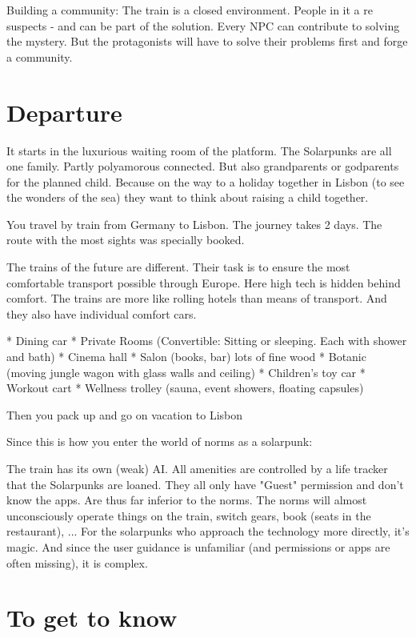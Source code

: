 \documentclass{book}
\begin{document}
Building a community:
The train is a closed environment. People in it a re suspects - and can be part of the solution. Every NPC can contribute to solving the mystery. But the protagonists will have to solve their problems first and forge a community.

\section{Departure}

It starts in the luxurious waiting room of the platform. The Solarpunks are all one family. Partly polyamorous connected. But also grandparents or godparents for the planned child. Because on the way to a holiday together in Lisbon (to see the wonders of the sea) they want to think about raising a child together.

You travel by train from Germany to Lisbon. The journey takes 2 days. The route with the most sights was specially booked.

The trains of the future are different. Their task is to ensure the most comfortable transport possible through Europe. Here high tech is hidden behind comfort. The trains are more like rolling hotels than means of transport. And they also have individual comfort cars.

* Dining car
* Private Rooms (Convertible: Sitting or sleeping. Each with shower and bath)
* Cinema hall
* Salon (books, bar) lots of fine wood
* Botanic (moving jungle wagon with glass walls and ceiling)
* Children's toy car
* Workout cart
* Wellness trolley (sauna, event showers, floating capsules)

Then you pack up and go on vacation to Lisbon

Since this is how you enter the world of norms as a solarpunk:

The train has its own (weak) AI. All amenities are controlled by a life tracker that the Solarpunks are loaned. They all only have "Guest" permission and don't know the apps. Are thus far inferior to the norms. The norms will almost unconsciously operate things on the train, switch gears, book (seats in the restaurant), ... For the solarpunks who approach the technology more directly, it's magic. And since the user guidance is unfamiliar (and permissions or apps are often missing), it is complex.

\section{To get to know}
\end{document}
